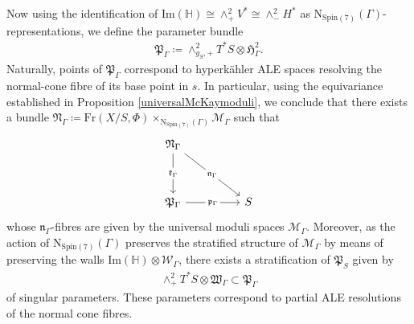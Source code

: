 \documentclass[psamsfonts]{amsart}
\theoremstyle{plain}
\theoremstyle{definition}{
\newtheorem{defi}{Definition}[section]
\newtheorem{ass}{Assumption}
\newtheorem*{nota}{Notation}}
\theoremstyle{remark}{
\newtheorem{rem}{Remark}
\newtheorem{ex}{Example}}
\theoremstyle{plain}{
\newtheorem{thm}{Theorem}[section]
\newtheorem{lem}{Lemma}[section]
\newtheorem{cor}{Corollary}[section]
\newtheorem{prop}{Proposition}[section]
\newtheorem{con}{Conjecture}[section]}
\newcommand{\m}[1]{{\mathrm{#1}}}
\begin{document}
Now using the identification of $\m{Im}(\mathbb{H})\cong \wedge^2 _+V^*\cong \wedge^2_-H^*$ as $\m{N}_{\m{Spin}(7)}(\Gamma)$-representations, we define the parameter bundle 
\begin{align*}
    \mathfrak{P}_\Gamma\coloneqq \wedge^2_{g_S,+}T^*S\otimes \mathfrak{H}^2_{\Gamma}.
\end{align*}
Naturally, points of $\mathfrak{P}_\Gamma$ correspond to hyperkähler ALE spaces resolving the normal-cone fibre of its base point in $s$. In particular, using the equivariance established in Proposition \ref{universalMcKaymoduli}, we conclude that there exists a bundle $\mathfrak{N}_\Gamma\coloneqq \m{Fr}(X/S,\Phi)\times_{\m{N}_{\m{Spin}(7)}(\Gamma)}\mathcal{M}_\Gamma$ such that 
\begin{equation*}
    \begin{tikzcd}
	{\mathfrak{N}_\Gamma} && \\
	\\
	{\mathfrak{P}_\Gamma} && S
	\arrow["{\mathfrak{k}_\Gamma}"{description}, from=1-1, to=3-1]
	\arrow["{\mathfrak{n}_\Gamma}"{description}, from=1-1, to=3-3]
	\arrow["{\mathfrak{p}_\Gamma}"{description}, from=3-1, to=3-3]
\end{tikzcd}
\end{equation*}
whose $\mathfrak{n}_\Gamma$-fibres are given by the universal moduli spaces $\mathcal{M}_\Gamma$. Moreover, as the action of $\m{N}_{\m{Spin}(7)}(\Gamma)$ preserves the stratified structure of $\mathcal{M}_\Gamma$ by means of preserving the walls $\m{Im}(\mathbb{H})\otimes\mathcal{W}_\Gamma$, there exists a stratification of $\mathfrak{P}_S$ given by 
\begin{align*}
    \wedge^2_+T^*S\otimes \mathfrak{W}_{\Gamma}\subset \mathfrak{P}_\Gamma
\end{align*}
of singular parameters. These parameters correspond to partial ALE resolutions of the normal cone fibres.\\
\end{document}

